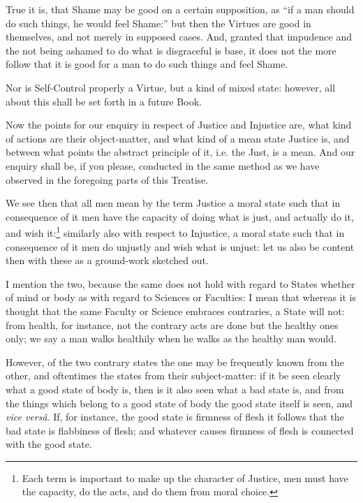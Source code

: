 True it is, that Shame may be good on a certain supposition, as “if a man
should do such things, he would feel Shame:” but then the Virtues are
good in themselves, and not merely in supposed cases. And, granted that
impudence and the not being ashamed to do what is disgraceful is base, it does
not the more follow that it is good for a man to do such things and feel Shame.

Nor is Self-Control properly a Virtue, but a kind of mixed state: however, all
about this shall be set forth in a future Book.



Now the points for our enquiry in respect of Justice and Injustice are, what
kind of actions are their object-matter, and what kind of a mean state Justice
is, and between what points the abstract principle of it, i.e. the Just, is a
mean. And our enquiry shall be, if you please, conducted in the same method as
we have observed in the foregoing parts of this Treatise.

We see then that all men mean by the term Justice a moral state such that in
consequence of it men have the capacity of doing what is just, and actually do
it, and wish it:\footnote{Each term is important to make up the character of Justice, men must have the
capacity, do the acts, and do them from moral choice.}
similarly also with respect to Injustice, a moral state such that in
consequence of it men do unjustly and wish what is unjust: let us also be
content then with these as a ground-work sketched out.

I mention the two, because the same does not hold with regard to States whether
of mind or body as with regard to Sciences or Faculties: I mean that whereas it
is thought that the same Faculty or Science embraces contraries, a State will
not: from health, for instance, not the contrary acts are done but the healthy
ones only; we say a man walks healthily when he walks as the healthy man would.

However, of the two contrary states the one may be frequently known from the
other, and oftentimes the states from their subject-matter: if it be seen
clearly what a good state of body is, then is it also seen what a bad state is,
and from the things which belong to a good state of body the good state itself
is seen, and \emph{vice versâ}. If, for instance, the good state is firmness of
flesh it follows that the bad state is flabbiness of flesh; and whatever causes
firmness of flesh is connected with the good state.


